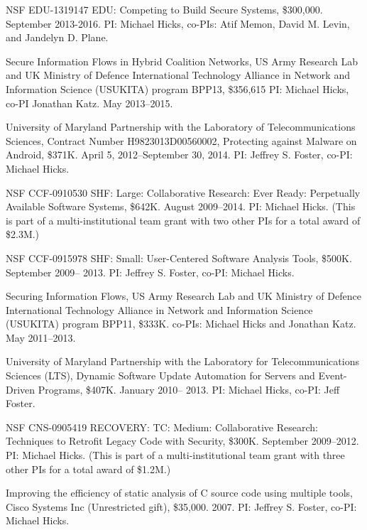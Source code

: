 \documentclass[11pt]{article}
\begin{document}
\begin{description}
\item NSF EDU-1319147 EDU: Competing to Build Secure Systems, \$300,000. September 2013-2016. PI: Michael Hicks, co-PIs: Atif Memon, David M. Levin, and Jandelyn D. Plane.

\item Secure Information Flows in Hybrid Coalition Networks, US Army Research Lab and UK Ministry of Defence International Technology Alliance in Network and Information Science (USUKITA) program BPP13, \$356,615 PI: Michael Hicks, co-PI Jonathan Katz. May 2013--2015.

\item University of Maryland Partnership with the Laboratory of Telecommunications Sciences, Contract Number H9823013D00560002, Protecting against Malware on Android, \$371K. April 5, 2012--September 30, 2014. PI: Jeffrey S. Foster, co-PI: Michael Hicks.

\item NSF CCF-0910530 SHF: Large: Collaborative Research: Ever Ready: Perpetually Available Software Systems, \$642K.  August 2009--2014. PI: Michael Hicks. (This is part of a multi-institutional team grant with two other PIs for a total award of \$2.3M.)

\item NSF CCF-0915978 SHF: Small: User-Centered Software Analysis Tools, \$500K. September 2009-- 2013. PI: Jeffrey S. Foster, co-PI: Michael Hicks.

\item Securing Information Flows, US Army Research Lab and UK Ministry of Defence International Technology Alliance in Network and Information Science (USUKITA) program BPP11, \$333K. co-PIs: Michael Hicks and Jonathan Katz. May 2011--2013.

\item University of Maryland Partnership with the Laboratory for Telecommunications Sciences (LTS), Dynamic Software Update Automation for Servers and Event-Driven Programs, \$407K. January 2010-- 2013. PI: Michael Hicks, co-PI: Jeff Foster.

\item NSF CNS-0905419 RECOVERY: TC: Medium: Collaborative Research: Techniques to Retrofit Legacy Code with Security, \$300K. September 2009--2012. PI: Michael Hicks. (This is part of a multi-institutional team grant with three other PIs for a total award of \$1.2M.)

\item Improving the efficiency of static analysis of C source code using multiple tools, Cisco Systems Inc (Unrestricted gift), \$35,000. 2007. PI: Jeffrey S. Foster, co-PI: Michael Hicks.


\end{description}
\end{document}
